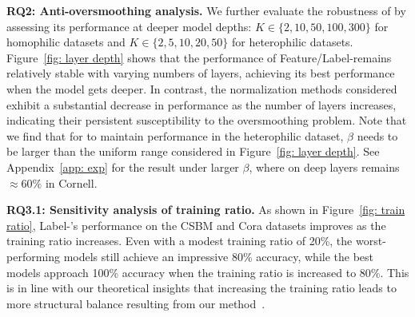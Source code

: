 \textbf{RQ2: Anti-oversmoothing analysis.}
We further evaluate the robustness of \ours by assessing its performance at deeper model depths: $K \in \{2, 10, 50, 100, 300\}$ for homophilic datasets and $K \in \{2, 5, 10, 20, 50\}$ for heterophilic datasets.
Figure~\ref{fig: layer depth} shows that the performance of Feature/Label-\ours remains relatively stable with varying
numbers of layers, achieving its best performance when the model gets deeper.
In contrast, the normalization methods considered exhibit a substantial decrease in performance as the number of layers increases, indicating their persistent susceptibility to the oversmoothing problem.
Note that we find that for \ours to maintain performance in the heterophilic dataset, \(\beta\) needs to be larger than the uniform range considered in Figure~\ref{fig: layer depth}. 
See Appendix~\ref{app: exp} for the result under larger \(\beta\), where \ours on deep layers remains $\approx60\%$ in Cornell.   

\textbf{RQ3.1: Sensitivity analysis of training ratio.}
As shown in Figure~\ref{fig: train ratio}, Label-\ours's performance on the CSBM and Cora datasets improves as the training ratio increases. Even with a modest training ratio of 20\%, the worst-performing models still achieve an impressive 80\% accuracy, while the best models approach 100\% accuracy when the training ratio is increased to 80\%. This is in line with our theoretical insights that increasing the training ratio leads to more structural balance resulting from our method~\ours. 
% 


